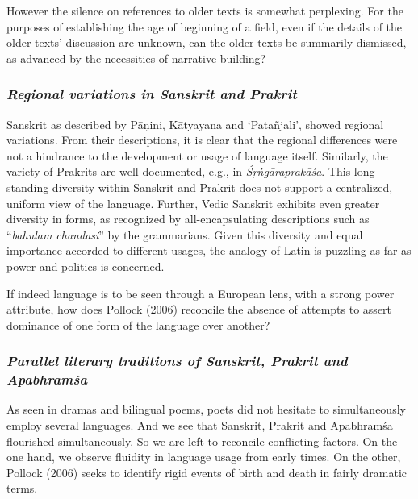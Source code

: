 However the silence on references to older texts is somewhat perplexing. For the purposes of establishing the age of beginning of a field, even if the details of the older texts’ discussion are unknown, can the older texts be summarily dismissed, as advanced by the necessities of narrative-building?

\subsubsection{{\sl Regional variations in Sanskrit and Prakrit}}

Sanskrit as described by Pāṇini, Kātyayana and `Patañjali', showed regional variations. From their descriptions, it is clear that the regional differences were not a hindrance to the development or usage of language itself. Similarly, the variety of Prakrits are well-documented, e.g., in {\sl Śṛṅgāraprakāśa}. This long-standing diversity within Sanskrit and Prakrit does not support a centralized, uniform view of the language. Further, Vedic Sanskrit exhibits even greater diversity in forms, as recognized by all-encapsulating descriptions such as “{\sl bahulam chandasi}” by the grammarians. Given this diversity and equal importance accorded to different usages, the analogy of Latin is puzzling as far as power and politics is concerned. 

If indeed language is to be seen through a European lens, with a strong power attribute, how does Pollock (2006) reconcile the absence of attempts to assert dominance of one form of the language over another? 
\vskip -40pt

\subsubsection{{\sl Parallel literary traditions of Sanskrit, Prakrit and Apabhramśa}}
\vskip -5pt

As seen in dramas and bilingual poems, poets did not hesitate to simultaneously employ several languages. And we see that Sanskrit, Prakrit and Apabhramśa flourished simultaneously. So we are left to reconcile conflicting factors. On the one hand, we observe fluidity in language usage from early times. On the other, Pollock (2006) seeks to identify rigid events of birth and death in fairly dramatic terms. 

